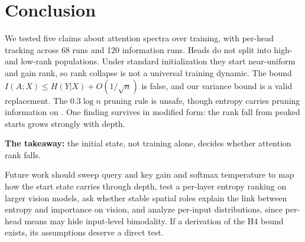 \section{Conclusion}
\label{sec:conclusion}

We tested five claims about attention spectra over training, with per-head tracking across 68 runs and 120 information runs. Heads do not split into high- and low-rank populations. Under standard initialization they start near-uniform and gain rank, so rank collapse is not a universal training dynamic. The bound $I(A;X)\le H(Y|X)+O(1/\sqrt n)$ is false, and our variance bound is a valid replacement. The $0.3\log n$ pruning rule is unsafe, though entropy carries pruning information on \cifar. One finding survives in modified form: the rank fall from peaked starts grows strongly with depth.

{\bf The takeaway:} the initial state, not training alone, decides whether attention rank falls.

Future work should sweep query and key gain and softmax temperature to map how the start state carries through depth, test a per-layer entropy ranking on larger vision models, ask whether stable spatial roles explain the link between entropy and importance on vision, and analyze per-input distributions, since per-head means may hide input-level bimodality. If a derivation of the H4 bound exists, its assumptions deserve a direct test.
